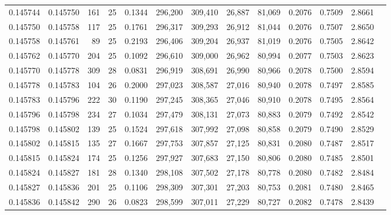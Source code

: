 \begin{tabular}{rrrrrrrrrrrrr}
0.145744 & 0.145750 & 161 &  25 &                                     0.1344 & 296,200 & 309,410 &  26,887 &  81,069 & 0.2076 & 0.7509 & 2.8661 \\
0.145750 & 0.145758 & 117 &  25 &                                     0.1761 & 296,317 & 309,293 &  26,912 &  81,044 & 0.2076 & 0.7507 & 2.8650 \\
0.145758 & 0.145761 &  89 &  25 &                                     0.2193 & 296,406 & 309,204 &  26,937 &  81,019 & 0.2076 & 0.7505 & 2.8642 \\
0.145762 & 0.145770 & 204 &  25 &                                     0.1092 & 296,610 & 309,000 &  26,962 &  80,994 & 0.2077 & 0.7503 & 2.8623 \\
0.145770 & 0.145778 & 309 &  28 &                                     0.0831 & 296,919 & 308,691 &  26,990 &  80,966 & 0.2078 & 0.7500 & 2.8594 \\
0.145778 & 0.145783 & 104 &  26 &                                     0.2000 & 297,023 & 308,587 &  27,016 &  80,940 & 0.2078 & 0.7497 & 2.8585 \\
0.145783 & 0.145796 & 222 &  30 &                                     0.1190 & 297,245 & 308,365 &  27,046 &  80,910 & 0.2078 & 0.7495 & 2.8564 \\
0.145796 & 0.145798 & 234 &  27 &                                     0.1034 & 297,479 & 308,131 &  27,073 &  80,883 & 0.2079 & 0.7492 & 2.8542 \\
0.145798 & 0.145802 & 139 &  25 &                                     0.1524 & 297,618 & 307,992 &  27,098 &  80,858 & 0.2079 & 0.7490 & 2.8529 \\
0.145802 & 0.145815 & 135 &  27 &                                     0.1667 & 297,753 & 307,857 &  27,125 &  80,831 & 0.2080 & 0.7487 & 2.8517 \\
0.145815 & 0.145824 & 174 &  25 &                                     0.1256 & 297,927 & 307,683 &  27,150 &  80,806 & 0.2080 & 0.7485 & 2.8501 \\
0.145824 & 0.145827 & 181 &  28 &                                     0.1340 & 298,108 & 307,502 &  27,178 &  80,778 & 0.2080 & 0.7482 & 2.8484 \\
0.145827 & 0.145836 & 201 &  25 &                                     0.1106 & 298,309 & 307,301 &  27,203 &  80,753 & 0.2081 & 0.7480 & 2.8465 \\
0.145836 & 0.145842 & 290 &  26 &                                     0.0823 & 298,599 & 307,011 &  27,229 &  80,727 & 0.2082 & 0.7478 & 2.8439 \\

\end{tabular}
